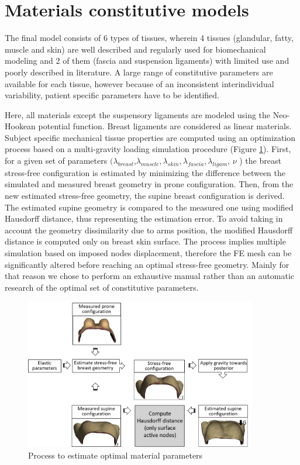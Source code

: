 \section{Materials constitutive models}
\label{section:myConstitutivModels}

The final model consists of 6 types of tissues, wherein 4 tissues (glandular, fatty, muscle and skin) are well described and regularly used for biomechanical modeling and 2 of them (fascia and suspension ligaments) with limited use and poorly described in literature. A large range of constitutive parameters are available for each tissue, however because of an inconsistent interindividual variability, patient specific parameters have to be identified.  


 Here, all materials except the suspensory ligaments are modeled using the Neo-Hookean potential function. Breast ligaments are considered as linear materials.  Subject specific mechanical tissue properties are computed using an optimization process based on a multi-gravity loading simulation procedure (Figure \ref{fig:optimizationalgo}). First, for a given set of parameters $(\lambda_{breast}$,$ \lambda_{muscle}, \lambda_{skin}, \lambda_{fascia}, \lambda_{ligam}$, $\nu$ ) the breast stress-free configuration is estimated by minimizing the difference between the simulated and measured breast geometry in prone configuration. Then, from the new estimated stress-free geometry, the supine breast configuration is derived. The estimated supine geometry is compared to the measured one using modified Hausdorff distance, thus representing the estimation error.  To avoid taking in account the geometry dissimilarity due to arms position, the modified Hausdorff distance is computed only on breast skin surface.  
The process implies multiple simulation based on imposed nodes displacement, therefore the FE mesh can be significantly altered before reaching an optimal stress-free geometry. Mainly for that reason we chose to perform an exhaustive manual rather than an automatic research of the optimal set of constitutive parameters. 


\begin{figure}[!h]
\centering
\includegraphics[width=0.9\textwidth,keepaspectratio]{figures/optimizationMaterialParameters.png} 
\caption{Process to estimate optimal material parameters}\label{fig:optimizationalgo}
\end{figure}
 
